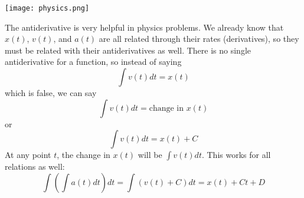\documentclass[../revisedmain.tex]{subfiles}
\begin{document}
	\vspace{.125in}
	\begin{center}
		\texttt{[image: physics.png]}
	\end{center}
	\vspace{.25in}
The antiderivative is very helpful in physics problems. We already know that $x(t)$, $v(t)$, and $a(t)$ are all related through their rates (derivatives), so they must be related with their antiderivatives as well. There is no single antiderivative for a function, so instead of saying $$\int v(t) dt=x(t)$$ which is false, we can say$$\int v(t)dt=\text{change in }x(t)$$or$$\int v(t)dt=x(t)+C$$At any point $t$, the change in $x(t)$ will be $\int v(t) dt$. This works for all relations as well:$$\int\left(\int a(t) dt\right)dt=\int (v(t)+C)dt=x(t)+Ct+D$$
\end{document}
